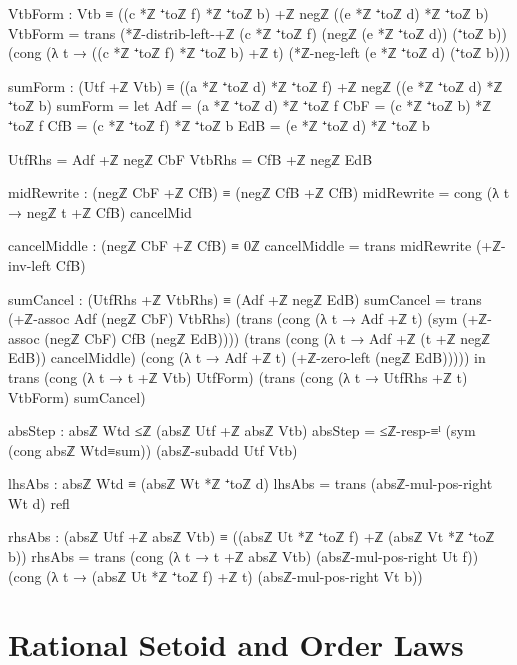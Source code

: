 \documentclass[11pt,a4paper]{book}
\begin{document}
\begin{code}
        VtbForm : Vtb ≡ ((c *ℤ ⁺toℤ f) *ℤ ⁺toℤ b) +ℤ negℤ ((e *ℤ ⁺toℤ d) *ℤ ⁺toℤ b)
        VtbForm =
          trans
            (*ℤ-distrib-left-+ℤ (c *ℤ ⁺toℤ f) (negℤ (e *ℤ ⁺toℤ d)) (⁺toℤ b))
            (cong (λ t → ((c *ℤ ⁺toℤ f) *ℤ ⁺toℤ b) +ℤ t)
                  (*ℤ-neg-left (e *ℤ ⁺toℤ d) (⁺toℤ b)))

        sumForm :
          (Utf +ℤ Vtb) ≡ ((a *ℤ ⁺toℤ d) *ℤ ⁺toℤ f) +ℤ negℤ ((e *ℤ ⁺toℤ d) *ℤ ⁺toℤ b)
        sumForm =
          let
            Adf = (a *ℤ ⁺toℤ d) *ℤ ⁺toℤ f
            CbF = (c *ℤ ⁺toℤ b) *ℤ ⁺toℤ f
            CfB = (c *ℤ ⁺toℤ f) *ℤ ⁺toℤ b
            EdB = (e *ℤ ⁺toℤ d) *ℤ ⁺toℤ b

            UtfRhs = Adf +ℤ negℤ CbF
            VtbRhs = CfB +ℤ negℤ EdB

            midRewrite : (negℤ CbF +ℤ CfB) ≡ (negℤ CfB +ℤ CfB)
            midRewrite =
              cong (λ t → negℤ t +ℤ CfB) cancelMid

            cancelMiddle : (negℤ CbF +ℤ CfB) ≡ 0ℤ
            cancelMiddle =
              trans midRewrite (+ℤ-inv-left CfB)

            sumCancel : (UtfRhs +ℤ VtbRhs) ≡ (Adf +ℤ negℤ EdB)
            sumCancel =
              trans
                (+ℤ-assoc Adf (negℤ CbF) VtbRhs)
                (trans
                  (cong (λ t → Adf +ℤ t)
                        (sym (+ℤ-assoc (negℤ CbF) CfB (negℤ EdB))))
                  (trans
                    (cong (λ t → Adf +ℤ (t +ℤ negℤ EdB)) cancelMiddle)
                    (cong (λ t → Adf +ℤ t) (+ℤ-zero-left (negℤ EdB)))))
          in
          trans
            (cong (λ t → t +ℤ Vtb) UtfForm)
            (trans
              (cong (λ t → UtfRhs +ℤ t) VtbForm)
              sumCancel)

    absStep : absℤ Wtd ≤ℤ (absℤ Utf +ℤ absℤ Vtb)
    absStep =
      ≤ℤ-resp-≡ˡ (sym (cong absℤ Wtd≡sum)) (absℤ-subadd Utf Vtb)

    lhsAbs : absℤ Wtd ≡ (absℤ Wt *ℤ ⁺toℤ d)
    lhsAbs =
      trans
        (absℤ-mul-pos-right Wt d)
        refl

    rhsAbs : (absℤ Utf +ℤ absℤ Vtb) ≡ ((absℤ Ut *ℤ ⁺toℤ f) +ℤ (absℤ Vt *ℤ ⁺toℤ b))
    rhsAbs =
      trans
        (cong (λ t → t +ℤ absℤ Vtb) (absℤ-mul-pos-right Ut f))
        (cong (λ t → (absℤ Ut *ℤ ⁺toℤ f) +ℤ t) (absℤ-mul-pos-right Vt b))
\end{code}

\chapter{Rational Setoid and Order Laws}
\end{document}

